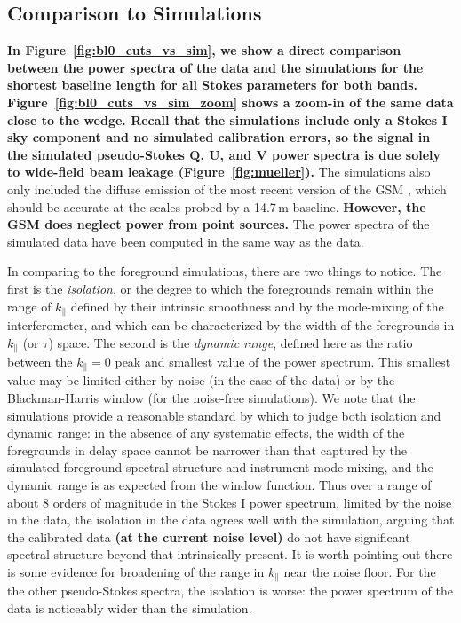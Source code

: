 \documentclass[twocolumn, trackchanges]{aastex61}
\newcommand{\edited}[1]{{\bf \color{blue} #1}}
\begin{document}
\subsection{Comparison to Simulations}

\edited{In Figure~\ref{fig:bl0_cuts_vs_sim}, we show a direct comparison between
  the power spectra of the data and the simulations for the shortest baseline
  length for all Stokes parameters for both
  bands. Figure~\ref{fig:bl0_cuts_vs_sim_zoom} shows a zoom-in of the same data
  close to the wedge. Recall that the simulations include only a Stokes I sky
  component and no simulated calibration errors, so the signal in the simulated
  pseudo-Stokes Q, U, and V power spectra is due solely to wide-field beam
  leakage (Figure~\ref{fig:mueller}).}  The simulations also only included the
diffuse emission of the most recent version of the GSM \citep{GSM.17}, which
should be accurate at the scales probed by a 14.7\,m baseline. \edited{However,
  the GSM does neglect power from point sources.}  The power spectra of the
simulated data have been computed in the same way as the data.

In comparing to the foreground simulations, there are two things to notice.  The
first is the {\it isolation}, or the degree to which the foregrounds remain
within the range of $k_\parallel$ defined by their intrinsic smoothness and by
the mode-mixing of the interferometer, and which can be characterized by the
width of the foregrounds in $k_\parallel$ (or $\tau$) space.  The second is the
{\it dynamic range}, defined here as the ratio between the $k_\parallel=0$ peak
and smallest value of the power spectrum.  This smallest value may be limited
either by noise (in the case of the data) or by the Blackman-Harris window (for
the noise-free simulations).  We note that the simulations provide a reasonable
standard by which to judge both isolation and dynamic range: in the absence of
any systematic effects, the width of the foregrounds in delay space cannot be
narrower than that captured by the simulated foreground spectral structure and
instrument mode-mixing, and the dynamic range is as expected from the window
function.  Thus over a range of about 8 orders of magnitude in the Stokes I
power spectrum, limited by the noise in the data, the isolation in the data
agrees well with the simulation, arguing that the calibrated data \edited{(at
  the current noise level)} do not have significant spectral structure beyond
that intrinsically present.  It is worth pointing out there is some evidence for
broadening of the range in $k_\parallel$ near the noise floor.  For the the other
pseudo-Stokes spectra, the isolation is worse: the power spectrum of the data is
noticeably wider than the simulation.
\end{document}
